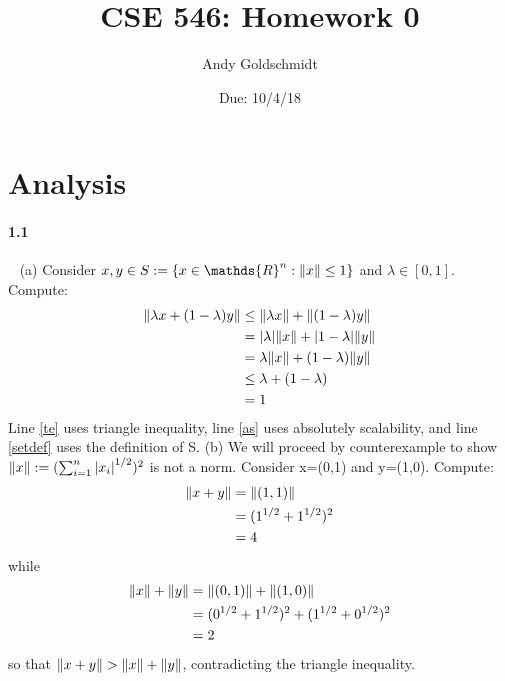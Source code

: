 \documentclass{article}
\title{CSE 546: Homework 0}
\author{Andy Goldschmidt}
\date{Due: 10/4/18}
\begin{document}
\maketitle

\section{Analysis}

\paragraph{1.1}\ \newline
(a) Consider $x,y \in S := \{ x \in \mathds{R}^n: \norm{x} \le 1 \} $ and $\lambda \in [0,1]$. Compute:
\begin{align}
    \norm{\lambda x + (1-\lambda) y}
    &\le \norm{\lambda x} + \norm{(1-\lambda) y} \label{te} \\
    &=  \abs{\lambda} \norm{x} + \abs{1 - \lambda} \norm{y} \label{as} \\
    &=  \lambda \norm{x} + (1 - \lambda) \norm{y} \\
    &\le  \lambda + (1 - \lambda) \label{setdef} \\
    &= 1
\end{align}
Line \ref{te} uses triangle inequality, line \ref{as} uses absolutely scalability, and line \ref{setdef} uses the definition of S.
\newline
\newline 
(b) We will proceed by counterexample to show $\norm{x} := (\sum _{i=1}^{n}{\abs{x_i}^{1/2}})^2$ is not a norm. Consider x=(0,1) and y=(1,0). Compute:
\begin{align}
    \norm{x+y} 
    &= \norm{(1,1)} \\
    &= (1^{1/2}+1^{1/2})^2 \\
    &= 4
\end{align}
while
\begin{align}
    \norm{x}+\norm{y} 
    &= \norm{(0,1)} + \norm{(1,0)} \\
    &= (0^{1/2}+1^{1/2})^2 + (1^{1/2}+0^{1/2})^2 \\
    &= 2
\end{align}
so that $\norm{x+y} > \norm{x}+\norm{y}$, contradicting the triangle inequality.
\end{document}
